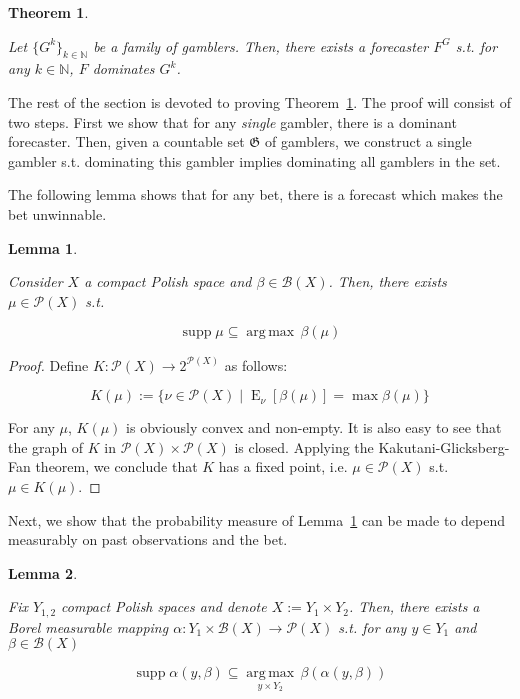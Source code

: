\documentclass[11pt]{article}
\theoremstyle{definition}
\theoremstyle{plain}
\newtheorem{theorem}{Theorem}%
\newtheorem{lemma}{Lemma}%
\newcommand{\Nats}{\mathbb{N}}
\newcommand{\Argmax}[1]{\underset{#1}{\operatorname{arg\,max}}\,}
\newcommand{\Sq}[2]{\{#1\}_{#2 \in \Nats}}
\DeclareMathOperator{\E}{E}
\newcommand{\PM}{\mathcal{P}}
\DeclareMathOperator{\Sp}{supp}
\newcommand{\Gm}{\mathcal{B}}
\newcommand{\GC}{\mathfrak{G}}
\begin{document}
\begin{theorem}
\label{thm:exist_dominant}

Let $\Sq{G^k}{k}$ be a family of gamblers. Then, there exists a forecaster $F^G$ s.t. for any $k \in \Nats$, $F$ dominates $G^k$.

\end{theorem}

The rest of the section is devoted to proving Theorem~\ref{thm:exist_dominant}. The proof will consist of two steps. First we show that for any \emph{single} gambler, there is a dominant forecaster. Then, given a countable set $\GC$ of gamblers, we construct a single gambler s.t. dominating this gambler implies dominating all gamblers in the set.

The following lemma shows that for any bet, there is a forecast which makes the bet unwinnable.

\begin{lemma}
\label{lmm:unwinnable}

Consider $X$ a compact Polish space and $\beta \in \Gm(X)$. Then, there exists $\mu \in \PM(X)$ s.t.

\begin{equation}
\Sp \mu \subseteq \Argmax{} \beta(\mu)
\end{equation}

\end{lemma}

\begin{proof}

Define ${K: \PM(X) \rightarrow 2^{\PM(X)}}$ as follows:

\[K(\mu):=\{\nu \in \PM(X) \mid \E_\nu[\beta(\mu)] = \max \beta(\mu)\}\]

For any ${\mu}$, ${K}(\mu)$ is obviously convex and non-empty. It is also easy to see that the graph of $K$ in $\PM(X) \times \PM(X)$ is closed. Applying the Kakutani-Glicksberg-Fan theorem, we conclude that $K$ has a fixed point, i.e. $\mu \in \PM(X)$ s.t. $\mu \in K(\mu)$.
\end{proof}

Next, we show that the probability measure of Lemma~\ref{lmm:unwinnable} can be made to depend measurably on past observations and the bet.

\begin{lemma}
\label{lmm:measurable_unwinnable}

Fix $Y_{1,2}$ compact Polish spaces and denote $X:=Y_1 \times Y_2$. Then, there exists a Borel measurable mapping $\alpha: Y_1 \times \Gm(X) \rightarrow \PM(X)$ s.t. for any $y \in Y_1$ and $\beta \in \Gm(X)$

\begin{equation}
\Sp \alpha(y,\beta) \subseteq \Argmax{y \times Y_2} \beta(\alpha(y,\beta))
\end{equation}

\end{lemma}
\end{document}
